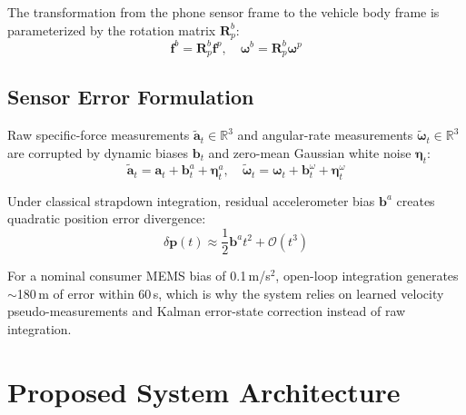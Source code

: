 \documentclass[conference]{IEEEtran}
\begin{document}
The transformation from the phone sensor frame to the vehicle body frame is parameterized by the rotation matrix $\mathbf{R}_p^b$:
\begin{equation}
\mathbf{f}^b = \mathbf{R}_p^b \mathbf{f}^p, \quad \boldsymbol{\omega}^b = \mathbf{R}_p^b \boldsymbol{\omega}^p
\end{equation}

\subsection{Sensor Error Formulation}

Raw specific-force measurements $\tilde{\mathbf{a}}_t \in \mathbb{R}^3$ and angular-rate measurements $\tilde{\boldsymbol{\omega}}_t \in \mathbb{R}^3$ are corrupted by dynamic biases $\mathbf{b}_t$ and zero-mean Gaussian white noise $\boldsymbol{\eta}_t$:
\begin{equation}
\tilde{\mathbf{a}}_t = \mathbf{a}_t + \mathbf{b}_t^a + \boldsymbol{\eta}_t^a, \quad \tilde{\boldsymbol{\omega}}_t = \boldsymbol{\omega}_t + \mathbf{b}_t^{\omega} + \boldsymbol{\eta}_t^{\omega}
\end{equation}

Under classical strapdown integration, residual accelerometer bias $\mathbf{b}^a$ creates quadratic position error divergence:
\begin{equation}
\delta \mathbf{p}(t) \approx \frac{1}{2} \mathbf{b}^a t^2 + \mathcal{O}(t^3)
\end{equation}

For a nominal consumer MEMS bias of 0.1\,m/s$^2$, open-loop integration generates $\sim$180\,m of error within 60\,s, which is why the system relies on learned velocity pseudo-measurements and Kalman error-state correction instead of raw integration.

\section{Proposed System Architecture}
\end{document}
